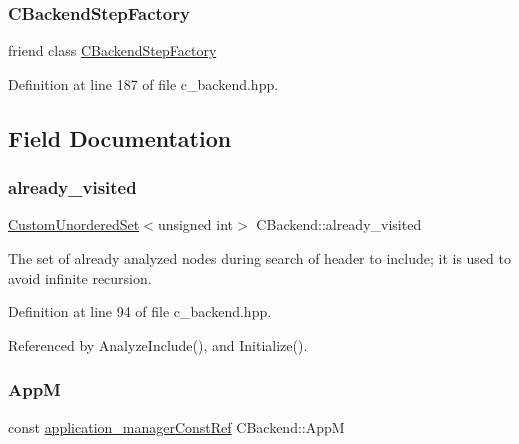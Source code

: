 \subsubsection{\texorpdfstring{C\+Backend\+Step\+Factory}{CBackendStepFactory}}
{\footnotesize\ttfamily friend class \hyperlink{classCBackendStepFactory}{C\+Backend\+Step\+Factory}\hspace{0.3cm}{\ttfamily [friend]}}



Definition at line 187 of file c\+\_\+backend.\+hpp.



\subsection{Field Documentation}
\mbox{\label{classCBackend_ab4058b823fc1c0cef4183ce282dcad79}} 
\subsubsection{\texorpdfstring{already\+\_\+visited}{already\_visited}}
{\footnotesize\ttfamily \hyperlink{classCustomUnorderedSet}{Custom\+Unordered\+Set}$<$unsigned int$>$ C\+Backend\+::already\+\_\+visited\hspace{0.3cm}{\ttfamily [protected]}}



The set of already analyzed nodes during search of header to include; it is used to avoid infinite recursion. 



Definition at line 94 of file c\+\_\+backend.\+hpp.



Referenced by Analyze\+Include(), and Initialize().

\mbox{\label{classCBackend_ae615cda6d03bdb848968b1eb1e79c273}} 
\subsubsection{\texorpdfstring{AppM}{AppM}}
{\footnotesize\ttfamily const \hyperlink{application__manager_8hpp_abb985163a2a3fb747f6f03b1eaadbb44}{application\+\_\+manager\+Const\+Ref} C\+Backend\+::\+AppM\hspace{0.3cm}{\ttfamily [protected]}}



